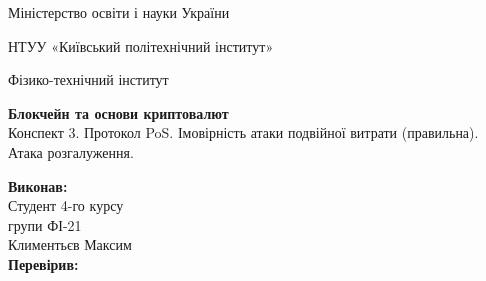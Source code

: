 \documentclass{article}
\begin{document}
    \begin{titlepage}
        \begin{center}

        Міністерство освіти і науки України
        
        НТУУ «Київський політехнічний інститут»
        
        Фізико-технічний інститут
        \vspace{3.3cm}
        
        {\textbf{Блокчейн та основи криптовалют}\\Конспект 3. Протокол PoS. Імовірність атаки подвійної витрати (правильна). Атака розгалуження.}

        \vspace{8.5cm}

        \begin{flushright}
            \textbf{Виконав:}\\Студент 4-го курсу\\групи ФІ-21\\Климентьєв Максим\\
            \textbf{Перевірив:}\\\text{\_\_\_\_\_\_\_\_\_\_\_\_\_\_\_\_\_\_}
        \end{flushright}

        \end{center}
    \end{titlepage}
    \newpage

    \tableofcontents
    \cleardoublepage
    \setcounter{page}{3}

    \newpage
\end{document}
